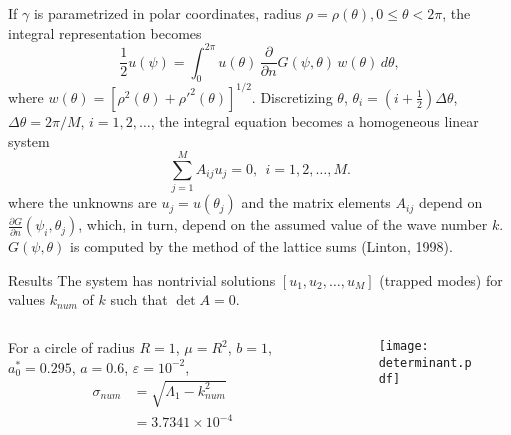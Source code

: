 \documentclass{beamer}
\begin{document}
\begin{frame}
  If $\gamma$ is parametrized in polar coordinates, radius $\rho = \rho(\theta), 0 \le \theta < 2\pi$, the integral representation becomes
  \begin{equation}
    \label{eq:2}
      \frac{1}{2}u(\psi) = \int_{0}^{2\pi} 
u(\theta) \, \frac{\partial}{\partial n} 
G(\psi,\theta)\, w(\theta) \, d\theta, 
  \end{equation}
  where $w(\theta) = [\rho^2(\theta) + \rho'^2(\theta)]^{1/2}$. Discretizing $\theta$, $\theta_i = (i + \frac{1}{2})\Delta\theta$, $\Delta\theta = 2\pi/M$, $i=1, 2,\ldots$, the integral equation becomes a homogeneous linear system
  \begin{equation}
    \label{eq:3}
    \sum_{j=1}^M A_{ij} u_j = 0,~~i=1,2,\ldots,M.
  \end{equation}
  where the unknowns are $u_j = u(\theta_j)$ and the matrix elements $A_{ij}$ depend on $\frac{\partial G}{\partial n}(\psi_i, \theta_j)$, which, in turn, depend on the assumed value of the wave number $k$. $G(\psi,\theta)$ is computed by the method of the lattice sums (Linton, 1998).
\end{frame}

\begin{frame}{Results}
  The system has nontrivial solutions $[u_1, u_2, \ldots, u_M]$ (trapped modes) for values $k_{num}$ of $k$ such that $\det A = 0$.

  \begin{columns}
    \begin{column}{0.3\textwidth}
      For a circle of radius $R=1$, $\mu=R^2$, $b=1$, $a_0^* = 0.295$, $a = 0.6$, $\varepsilon=10^{-2}$,
      \begin{align}
        \sigma_{num} &= \sqrt{\Lambda_1 - k_{num}^2} \nonumber\\
                     &= 3.7341 \times 10^{-4} \nonumber
      \end{align}
    \end{column}
    
    \begin{column}{0.7\textwidth}
      \begin{figure}[htbp]
        \centering
        \texttt{[image: determinant.pdf]}
      \end{figure}
      
    \end{column}
  \end{columns}
  
\end{frame}
\end{document}
